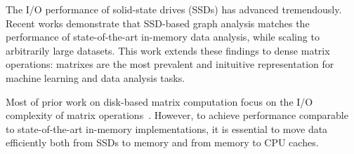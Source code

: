 

The I/O performance of solid-state drives (SSDs) has advanced tremendously.
Recent works \cite{flashgraph, gridgraph} demonstrate that SSD-based 
graph analysis matches the performance of 
state-of-the-art in-memory data analysis, while scaling to arbitrarily large datasets.
This work extends these findings to dense matrix operations: matrixes are the most
prevalent and inituitive representation for machine learning and data analysis tasks.





Most of prior work on disk-based matrix computation focus on the I/O
complexity of matrix operations~\cite{}. However, to achieve performance
comparable to state-of-the-art in-memory implementations, it is essential
to move data efficiently both from SSDs to memory and from memory to CPU
caches.


